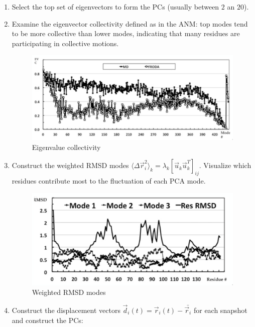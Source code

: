 \begin{enumerate}
\item Select the top set of eigenvectors to form the PCs (usually between $2$ an $20$).
\item Examine the eigenvector collectivity defined as in the ANM: top modes tend to be more collective than lower modes, indicating that many residues are participating in collective motions.

	\begin{figure}[H]
		\includegraphics[width=\textwidth]{eigenvalue-collectivity}
		\caption{Eigenvalue collectivity}
		\label{fig:eigenvalue-collectivity}
	\end{figure}

\item Construct the weighted RMSD modes $\langle\Delta\vec{r}_i^2\rangle_k = \lambda_k[\vec{u}_k\vec{u}_k^T]_{ij}$.
	Visualize which residues contribute most to the fluctuation of each PCA mode.

	\begin{figure}[H]
		\includegraphics[width=\textwidth]{weighted-rmsd}
		\caption{Weighted RMSD modes}
		\label{fig:weighted-rmsd}
	\end{figure}

\item Construct the displacement vectors $\vec{d}_i(t) = \vec{r}_i(t)-\bar{\vec{r}_i}$ for each snapshot and construct the PCs:


\end{enumerate}
